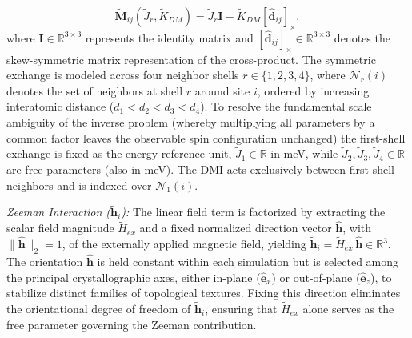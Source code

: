 \documentclass[final,5p,times,twocolumn]{elsarticle}
\begin{document}
\begin{equation}\label{eq:MatrixDecomposition}
    \tilde{\mathbf{M}}_{ij}(\tilde{J}_r,\tilde{K}_{DM}) = 
        \tilde{J}_r \mathbf{I} - \tilde{K}_{DM} [\hat{\mathbf{d}}_{ij}]_{\times},
\end{equation}
where $\mathbf{I} \in \mathbb{R}^{3 \times 3}$ represents the identity matrix and $[\hat{\mathbf{d}}_{ij}]_{\times} \in \mathbb{R}^{3 \times 3}$ denotes the skew-symmetric matrix representation of the cross-product. The symmetric exchange is modeled across four neighbor shells $r \in \{1,2,3,4\}$, where $\mathcal{N}_r(i)$ denotes the set of neighbors at shell $r$ around site $i$, ordered by increasing interatomic distance ($d_1 < d_2 < d_3 < d_4$). To resolve the fundamental scale ambiguity of the inverse problem (whereby multiplying all parameters by a common factor leaves the observable spin configuration unchanged) the first-shell exchange is fixed as the energy reference unit, $\tilde{J}_1\in \mathbb{R}$ in meV, while $\tilde{J}_2, \tilde{J}_3, \tilde{J}_4 \in \mathbb{R}$ are free parameters (also in meV). The DMI acts exclusively between first-shell neighbors and is indexed over $\mathcal{N}_1(i)$.

\emph{Zeeman Interaction ($\tilde{\mathbf{h}}_i$):} The linear field term is factorized by extracting the scalar field magnitude $\tilde{H}_{ex}$ and a fixed normalized direction vector $\hat{\mathbf{h}}$, with $\|\hat{\mathbf{h}}\|_2 = 1$, of the externally applied magnetic field, yielding $\tilde{\mathbf{h}}_i = \tilde{H}_{ex}\,\hat{\mathbf{h}}\in\mathbb{R}^3$. The orientation $\hat{\mathbf{h}}$ is held constant within each simulation but is selected among the principal crystallographic axes, either in-plane ($\hat{\mathbf{e}}_x$) or out-of-plane ($\hat{\mathbf{e}}_z$), to stabilize distinct families of topological textures. Fixing this direction eliminates the orientational degree of freedom of $\tilde{\mathbf{h}}_i$, ensuring that $\tilde{H}_{ex}$ alone serves as the free parameter governing the Zeeman contribution.
\end{document}
